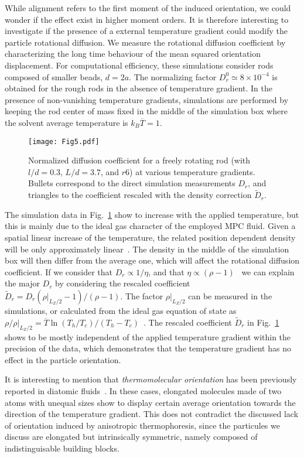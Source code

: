 \documentclass[aps,pre,twocolumn,showpacs,superscriptaddress]{revtex4-1}
\begin{document}
While alignment refers to the first moment of the induced
  orientation, we could wonder if the effect exist in higher moment
  orders.  It is therefore interesting to investigate if the presence
of a external temperature gradient could modify the particle
rotational diffusion.  We measure the rotational diffusion coefficient
by characterizing the long time behaviour of the mean squared
orientation displacement.  For computational efficiency, these
 simulations consider rods composed of smaller beads, $d=2a$. The
normalizing factor $D_r^0\simeq 8 \times 10^{-4}$ is obtained for the
rough rods in the absence of temperature gradient. In the
  presence of non-vanishing temperature gradients, simulations are
performed by keeping the rod center of mass fixed in the middle of the
simulation box where the solvent average temperature is
$k_B\overline{T} = 1$.
\begin{figure}[h!]
\texttt{[image: Fig5.pdf]}
\caption{Normalized diffusion coefficient for a freely rotating rod
  (with $l/d= 0.3$, $L/d=3.7$, and $r6$) at various temperature
  gradients.  Bullets correspond to the direct simulation
  measurements $D_r$, and triangles to the coefficient rescaled with the
  density correction $\tilde{D}_r$. \label{fig:Dr}}
\end{figure}
The simulation data in Fig.~\ref{fig:Dr} show to increase with the
applied temperature, but this is mainly due to the ideal gas character
of the employed MPC fluid. Given a spatial linear increase of the
temperature, the related position dependent density will be only
approximately linear~\cite{luese12jcp}. The density in the middle of
the simulation box will then differ from the average one, which will
affect the rotational diffusion coefficient.  If we consider that
$D_r\propto 1/\eta$, and that $\eta\propto (\rho-1)$~\cite{ihl03b} we
can explain the major $D_r$ by considering the rescaled coefficient
$\tilde{D}_r = D_r(\rho|_{L_Z/2}-1)/(\rho-1)$.  The factor
$\rho|_{L_Z/2}$ can be measured in the simulations, or calculated from
the ideal gas equation of state as $\rho/\rho|_{L_Z/2} =
\overline{T}\ln(T_h/T_c)/(T_h-T_c)$~\cite{luese12jcp}. The rescaled
coefficient $\tilde{D}_r$ in Fig.~\ref{fig:Dr} shows to be mostly
independent of the applied temperature gradient within the precision
of the data, which demonstrates that the temperature gradient has no
effect in the particle orientation.

It is interesting to mention that {\em thermomolecular orientation}
has been previously reported in diatomic
fluids~\cite{romer12,daub14,lee16}. %
In these cases, elongated molecules made of two atoms with unequal
sizes show to display certain average orientation towards the
direction of the temperature gradient.  This does not contradict the
discussed lack of orientation induced by anisotropic thermophoresis,
since the particules we discuss are elongated but intrinsically
symmetric, namely composed of indistinguisable building blocks.
\end{document}
